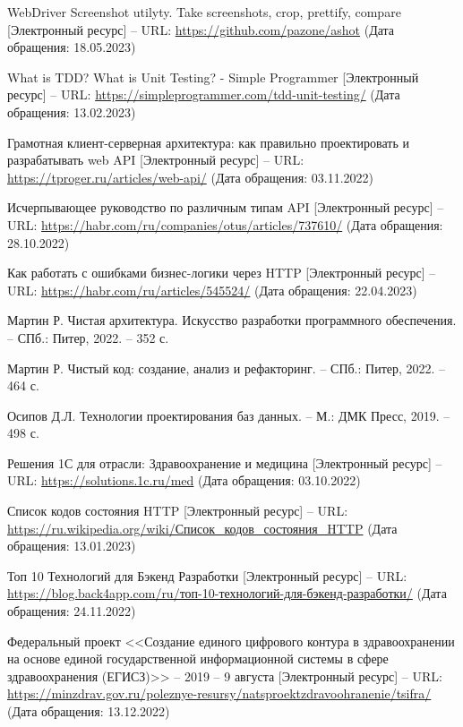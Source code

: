 \documentclass[a4paper,article]{article}
\begin{document}
\begin{sloppypar}
\begin{enumerate}[leftmargin=*, itemindent=\labelwidth]
         WebDriver Screenshot utilyty. Take screenshots, crop, prettify, compare [Электронный ресурс] -- URL: \url{https://github.com/pazone/ashot} (Дата обращения: 18.05.2023)
        
         What is TDD? What is Unit Testing? - Simple Programmer [Электронный ресурс] -- URL: \url{https://simpleprogrammer.com/tdd-unit-testing/} (Дата обращения: 13.02.2023)
        
         Грамотная клиент-серверная архитектура: как правильно проектировать и разрабатывать web API [Электронный ресурс] -- URL: \url{https://tproger.ru/articles/web-api/} (Дата обращения: 03.11.2022)
        
         Исчерпывающее руководство по различным типам API [Электронный ресурс] -- URL: \url{https://habr.com/ru/companies/otus/articles/737610/} (Дата обращения: 28.10.2022)
        
         Как работать с ошибками бизнес-логики через HTTP [Электронный ресурс] -- URL: \url{https://habr.com/ru/articles/545524/} (Дата обращения: 22.04.2023)
        
         Мартин Р. Чистая архитектура. Искусство разработки программного обеспечения. -- СПб.: Питер, 2022. -- 352 с.
        
         Мартин Р. Чистый код: создание, анализ и рефакторинг. -- СПб.: Питер, 2022. -- 464 с.
        
         Осипов Д.Л. Технологии проектирования баз данных. -- М.: ДМК Пресс, 2019. -- 498 с.
        
         Решения 1С для отрасли: Здравоохранение и медицина [Электронный ресурс] -- URL: \url{https://solutions.1c.ru/med} (Дата обращения: 03.10.2022)
        
         Список кодов состояния HTTP [Электронный ресурс] -- URL: \url{https://ru.wikipedia.org/wiki/Список_кодов_состояния_HTTP} (Дата обращения: 13.01.2023)
        
         Топ 10 Технологий для Бэкенд Разработки [Электронный ресурс] -- URL: \url{https://blog.back4app.com/ru/топ-10-технологий-для-бэкенд-разработки/} (Дата обращения: 24.11.2022)
        
         Федеральный проект <<Создание единого цифрового контура в здравоохранении на основе единой государственной информационной системы в сфере здравоохранения (ЕГИСЗ)>> -- 2019 -- 9 августа [Электронный ресурс] -- URL: \url{https://minzdrav.gov.ru/poleznye-resursy/natsproektzdravoohranenie/tsifra/} (Дата обращения: 13.12.2022)
        

\end{enumerate}
\end{sloppypar}
\end{document}

